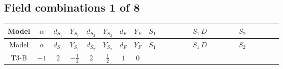 \documentclass[8pt]{article}
\begin{document}
\begin{landscape}
\subsection*{Field combinations 1 of 8}
\begin{longtable}{@{}cccccccc >{\raggedright\arraybackslash}p{0.21\linewidth} >{\raggedright\arraybackslash}p{0.21\linewidth} >{\raggedright\arraybackslash}p{0.21\linewidth}@{}}
\toprule
Model & $\alpha$ & $d_{S_1}$ & $Y_{S_1}$ & $d_{S_2}$ & $Y_{S_2}$ & $d_F$ & $Y_F$ & $S_1$ & $S_1\,D$ & $S_2$ \\
\midrule
\endfirsthead
\toprule
Model & $\alpha$ & $d_{S_1}$ & $Y_{S_1}$ & $d_{S_2}$ & $Y_{S_2}$ & $d_F$ & $Y_F$ & $S_1$ & $S_1\,D$ & $S_2$ \\
\midrule
\endhead
T3-B & $-1$ & $2$ & $-\frac{1}{2}$ & $2$ & $\frac{1}{2}$ & $1$ & $0$ & \scriptsize\adjustbox{max width=\linewidth}{$\begin{gathered} -C_{S_1^\dagger S_1} S_{1,j_1} S_{1,j_1}{}^{\dagger } \\ +\frac{1}{2} C_{S_1^\dagger S_1} \hbar  \overline{y_{1,i_1,r_1}} S_{1,j_1} y_{1,i_1,r_1} S_{1,j_1}{}^{\dagger } \\ +\frac{C_{S_1^\dagger S_1} \hbar  \overline{y_{1,i_1,r_1}} S_{1,j_1} y_{1,i_1,r_1} S_{1,j_1}{}^{\dagger }}{\epsilon }\end{gathered}$} & \scriptsize\adjustbox{max width=\linewidth}{$\begin{gathered} +D_{\mu _1}\left(S_{1,j_1}\right){}^{\dagger } D_{\mu _1}\left(S_{1,j_1}\right)\end{gathered}$} & \scriptsize\adjustbox{max width=\linewidth}{$\begin{gathered} -C_{S_2^\dagger S_2} S_{2,j_1} S_{2,j_1}{}^{\dagger } \\ +\frac{1}{2} C_{S_2^\dagger S_2} \hbar  \overline{y_{2,i_1,r_1}} S_{2,j_1} y_{2,i_1,r_1} S_{2,j_1}{}^{\dagger } \\ +\frac{C_{S_2^\dagger S_2} \hbar  \overline{y_{2,i_1,r_1}} S_{2,j_1} y_{2,i_1,r_1} S_{2,j_1}{}^{\dagger }}{\epsilon }\end{gathered}$} \\

\end{longtable}
\end{landscape}
\end{document}
